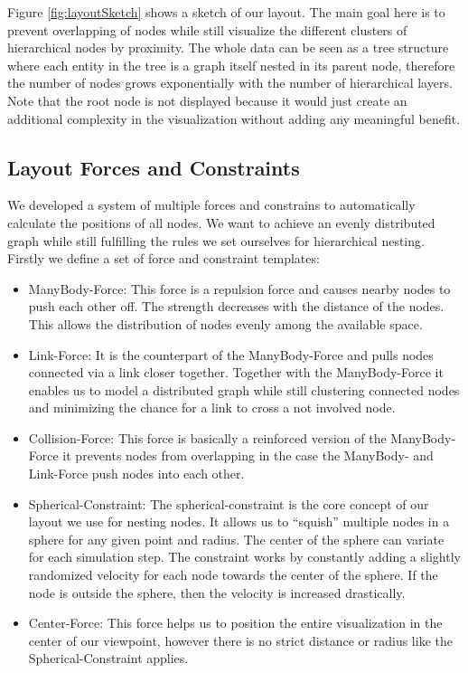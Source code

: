 Figure \ref{fig:layoutSketch} shows a sketch of our layout. The main goal here is to prevent overlapping of nodes while still visualize the different clusters of hierarchical nodes by proximity. The whole data can be seen as a tree structure where each entity in the tree is a graph itself nested in its parent node, therefore the number of nodes grows exponentially with the number of hierarchical layers. Note that the root node is not displayed because it would just create an additional complexity in the visualization without adding any meaningful benefit.

\subsection{Layout Forces and Constraints}
We developed a system of multiple forces and constrains to automatically calculate the positions of all nodes. We want to achieve an evenly distributed graph while still fulfilling the rules we set ourselves for hierarchical nesting. Firstly we define a set of force and constraint templates:
\begin{itemize}
    \item ManyBody-Force: This force is a repulsion force and causes nearby nodes to push each other off. The strength decreases with the distance of the nodes. This allows the distribution of nodes evenly among the available space.
    \item Link-Force: It is the counterpart of the ManyBody-Force and pulls nodes connected via a link closer together. Together with the ManyBody-Force it enables us to model a distributed graph while still clustering connected nodes and minimizing the chance for a link to cross a not involved node.
    \item Collision-Force: This force is basically a reinforced version of the ManyBody-Force it prevents nodes from overlapping in the case the ManyBody- and Link-Force push nodes into each other.
    \item Spherical-Constraint: The spherical-constraint is the core concept of our layout we use for nesting nodes. It allows us to “squish” multiple nodes in a sphere for any given point and radius. The center of the sphere can variate for each simulation step. The constraint works by constantly adding a slightly randomized velocity for each node towards the center of the sphere. If the node is outside the sphere, then the velocity is increased drastically.
    \item Center-Force: This force helps us to position the entire visualization in the center of our viewpoint, however there is no strict distance or radius like the Spherical-Constraint applies.
\end{itemize}

